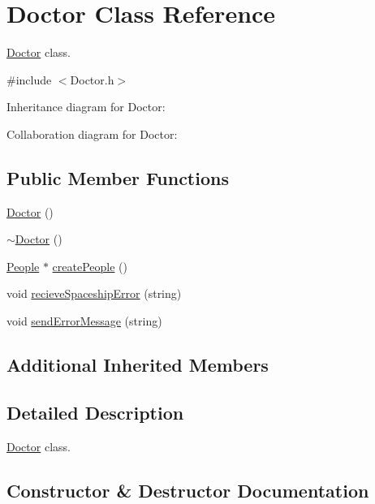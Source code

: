 \hypertarget{classDoctor}{}\section{Doctor Class Reference}
\label{classDoctor}


\hyperlink{classDoctor}{Doctor} class.  




{\ttfamily \#include $<$Doctor.\+h$>$}



Inheritance diagram for Doctor\+:


Collaboration diagram for Doctor\+:
\subsection*{Public Member Functions}
\begin{DoxyCompactItemize}
\item 
\hyperlink{classDoctor_ac71a90316796a8e72a8d9db536de274a}{Doctor} ()
\item 
\hyperlink{classDoctor_a1481ccfafebc7a2424d3659a0223ebfe}{$\sim$\+Doctor} ()
\item 
\hyperlink{classPeople}{People} $\ast$ \hyperlink{classDoctor_a684a580014991a9193d0021796041ff5}{create\+People} ()
\item 
void \hyperlink{classDoctor_a820dca3b9f05d3f69c47bd7318923b88}{recieve\+Spaceship\+Error} (string)
\item 
void \hyperlink{classDoctor_a5a524981ce52102f975cf9c569137ce5}{send\+Error\+Message} (string)
\end{DoxyCompactItemize}
\subsection*{Additional Inherited Members}


\subsection{Detailed Description}
\hyperlink{classDoctor}{Doctor} class. 

\subsection{Constructor \& Destructor Documentation}
\mbox{\label{classDoctor_ac71a90316796a8e72a8d9db536de274a}} 
